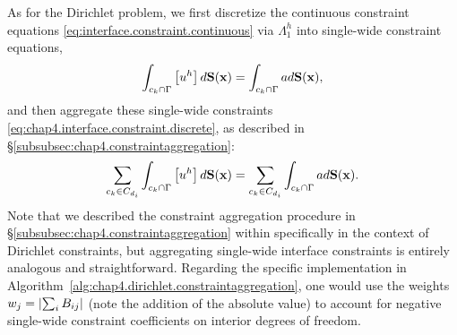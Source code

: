 As for the Dirichlet problem, we first discretize the continuous constraint equations \eqref{eq:interface.constraint.continuous} via $\Lambda^h_1$ into single-wide constraint equations,
\begin{equation} \label{eq:chap4.interface.constraint.discrete}
\int_{c_k \cap \Gamma} \left[ u^h \right] d\mathbf{S}(\mathbf{x}) = \int_{c_k \cap \Gamma} a d\mathbf{S}(\mathbf{x}),
\end{equation}
and then aggregate these single-wide constraints \eqref{eq:chap4.interface.constraint.discrete}, as described in \S\ref{subsubsec:chap4.constraintaggregation}:
\begin{equation} \label{eq:chap4.interface.aggregateconstraint}
\sum_{c_k \in C_{d_i}} \int_{c_k \cap \Gamma} \left[ u^h \right] d\mathbf{S}(\mathbf{x}) = \sum_{c_k \in C_{d_i}} \int_{c_k \cap \Gamma} a d\mathbf{S}(\mathbf{x}).
\end{equation}
Note that we described the constraint aggregation procedure in \S\ref{subsubsec:chap4.constraintaggregation} within specifically in the context of Dirichlet constraints, but aggregating single-wide interface constraints is entirely analogous and straightforward. Regarding the specific implementation in Algorithm~\ref{alg:chap4.dirichlet.constraintaggregation}, one would use the weights $w_j = \left\lvert \sum_i B_{ij} \right\rvert$ (note the addition of the absolute value) to account for negative single-wide constraint coefficients on interior degrees of freedom.

